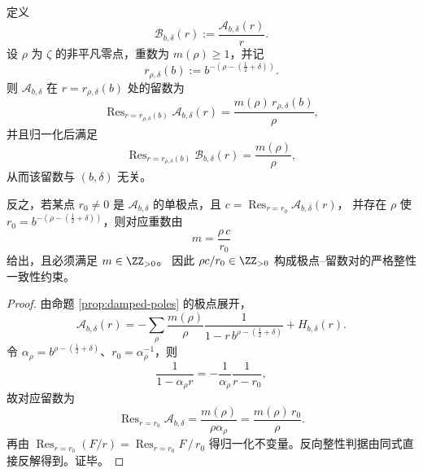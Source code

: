 \begin{proposition}[归一化留数不变量与整重数一致性证书]\label{prop:abel-normalized-residue-invariant-integrality}
定义
\[
\mathcal B_{b,\delta}(r):=\frac{\mathcal A_{b,\delta}(r)}{r}.
\]
设 \(\rho\) 为 \(\zeta\) 的非平凡零点，重数为 \(m(\rho)\ge 1\)，并记
\[
r_{\rho,\delta}(b):=b^{-(\rho-(\frac12+\delta))}.
\]
则 \(\mathcal A_{b,\delta}\) 在 \(r=r_{\rho,\delta}(b)\) 处的留数为
\[
\operatorname{Res}_{r=r_{\rho,\delta}(b)}\mathcal A_{b,\delta}(r)
=\frac{m(\rho)\,r_{\rho,\delta}(b)}{\rho},
\]
并且归一化后满足
\[
\boxed{\;
\operatorname{Res}_{r=r_{\rho,\delta}(b)}\mathcal B_{b,\delta}(r)=\frac{m(\rho)}{\rho},
\;}
\]
从而该留数与 \((b,\delta)\) 无关。
\par
反之，若某点 \(r_0\neq 0\) 是 \(\mathcal A_{b,\delta}\) 的单极点，且
\(
c=\operatorname{Res}_{r=r_0}\mathcal A_{b,\delta}(r)
\)，
并存在 \(\rho\) 使 \(r_0=b^{-(\rho-(\frac12+\delta))}\)，则对应重数由
\[
m=\frac{\rho\,c}{r_0}
\]
给出，且必须满足 \(m\in\ZZ_{>0}\)。
因此 \(\rho c/r_0\in\ZZ_{>0}\) 构成极点--留数对的严格整性一致性约束。
\end{proposition}
\begin{proof}
由命题 \ref{prop:damped-poles} 的极点展开，
\[
\mathcal A_{b,\delta}(r)
=-\sum_\rho \frac{m(\rho)}{\rho}\frac1{1-r\,b^{\rho-(\frac12+\delta)}}+H_{b,\delta}(r).
\]
令 \(\alpha_\rho=b^{\rho-(\frac12+\delta)}\)、\(r_0=\alpha_\rho^{-1}\)，则
\[
\frac1{1-\alpha_\rho r}=-\frac1{\alpha_\rho}\frac1{r-r_0},
\]
故对应留数为
\[
\operatorname{Res}_{r=r_0}\mathcal A_{b,\delta}
=\frac{m(\rho)}{\rho\alpha_\rho}
=\frac{m(\rho)\,r_0}{\rho}.
\]
再由
\(
\operatorname{Res}_{r=r_0}(F/r)=\operatorname{Res}_{r=r_0}F\,/\,r_0
\)
得归一化不变量。反向整性判据由同式直接反解得到。证毕。
\end{proof}

